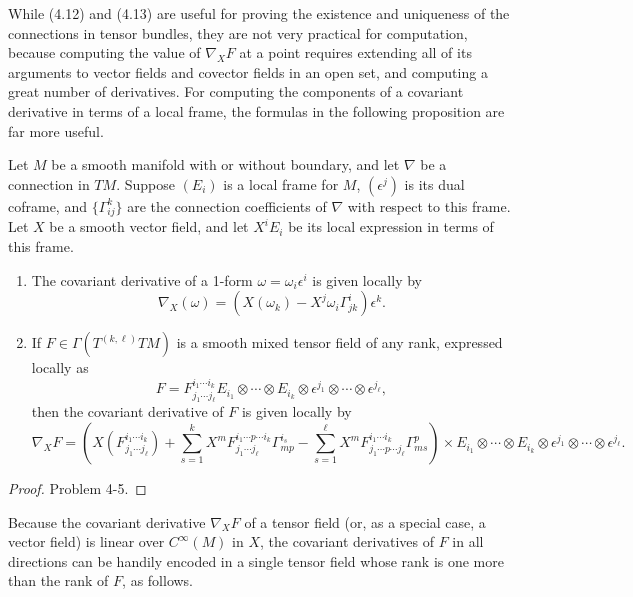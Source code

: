 While (4.12) and (4.13) are useful for proving the existence and uniqueness of the connections in tensor bundles, they are not very practical for computation, because computing the value of $\nabla_X F$ at a point requires extending all of its arguments to vector fields and covector fields in an open set, and computing a great number of derivatives. For computing the components of a covariant derivative in terms of a local frame, the formulas in the following proposition are far more useful.

\begin{proposition}
\label{prop:covariant-derivative-components}
Let $M$ be a smooth manifold with or without boundary, and let $\nabla$ be a connection in $TM$. Suppose $(E_i)$ is a local frame for $M$, $(\epsilon^j)$ is its dual coframe, and $\{\Gamma^k_{ij}\}$ are the connection coefficients of $\nabla$ with respect to this frame. Let $X$ be a smooth vector field, and let $X^i E_i$ be its local expression in terms of this frame.

\begin{enumerate}
\item[(a)] The covariant derivative of a 1-form $\omega = \omega_i \epsilon^i$ is given locally by
\[
\nabla_X(\omega) = (X(\omega_k) - X^j \omega_i \Gamma^i_{jk}) \epsilon^k.
\]

\item[(b)] If $F \in \Gamma(T^{(k,\ell)}TM)$ is a smooth mixed tensor field of any rank, expressed locally as
\[
F = F^{i_1 \cdots i_k}_{j_1 \cdots j_\ell} E_{i_1} \otimes \cdots \otimes E_{i_k} \otimes \epsilon^{j_1} \otimes \cdots \otimes \epsilon^{j_\ell},
\]
then the covariant derivative of $F$ is given locally by
\[
\nabla_X F = \left(X(F^{i_1 \cdots i_k}_{j_1 \cdots j_\ell}) + \sum_{s=1}^k X^m F^{i_1 \cdots p \cdots i_k}_{j_1 \cdots j_\ell} \Gamma^{i_s}_{mp} - \sum_{s=1}^{\ell} X^m F^{i_1 \cdots i_k}_{j_1 \cdots p \cdots j_\ell} \Gamma^p_{ms}\right) \times E_{i_1} \otimes \cdots \otimes E_{i_k} \otimes \epsilon^{j_1} \otimes \cdots \otimes \epsilon^{j_\ell}.
\]
\end{enumerate}
\end{proposition}

\begin{proof}
Problem 4-5.
\end{proof}

Because the covariant derivative $\nabla_X F$ of a tensor field (or, as a special case, a vector field) is linear over $C^\infty(M)$ in $X$, the covariant derivatives of $F$ in all directions can be handily encoded in a single tensor field whose rank is one more than the rank of $F$, as follows.

